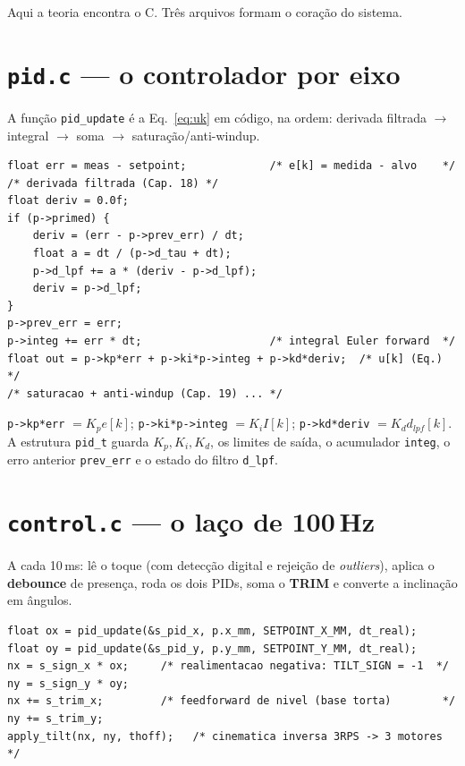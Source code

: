 Aqui a teoria encontra o C. Tr\^es arquivos formam o cora\c{c}\~ao do sistema.

\section{\texttt{pid.c} --- o controlador por eixo}
A fun\c{c}\~ao \texttt{pid\_update} \'e a Eq.~\eqref{eq:uk} em c\'odigo, na ordem:
derivada filtrada $\to$ integral $\to$ soma $\to$ satura\c{c}\~ao/anti-windup.
\begin{lstlisting}[caption={N\'ucleo de \texttt{pid\_update} (resumido).},label={lst:pid}]
float err = meas - setpoint;             /* e[k] = medida - alvo    */
/* derivada filtrada (Cap. 18) */
float deriv = 0.0f;
if (p->primed) {
    deriv = (err - p->prev_err) / dt;
    float a = dt / (p->d_tau + dt);
    p->d_lpf += a * (deriv - p->d_lpf);
    deriv = p->d_lpf;
}
p->prev_err = err;
p->integ += err * dt;                    /* integral Euler forward  */
float out = p->kp*err + p->ki*p->integ + p->kd*deriv;  /* u[k] (Eq.) */
/* saturacao + anti-windup (Cap. 19) ... */
\end{lstlisting}
\begin{conceito}
\texttt{p->kp*err} $=K_p e[k]$;\quad
\texttt{p->ki*p->integ} $=K_i I[k]$;\quad
\texttt{p->kd*deriv} $=K_d d_{lpf}[k]$.\quad
A estrutura \texttt{pid\_t} guarda $K_p,K_i,K_d$, os limites de sa\'ida, o
acumulador \texttt{integ}, o erro anterior \texttt{prev\_err} e o estado do filtro
\texttt{d\_lpf}.
\end{conceito}

\section{\texttt{control.c} --- o la\c{c}o de 100\,Hz}
A cada 10\,ms: l\^e o toque (com detec\c{c}\~ao digital e rejei\c{c}\~ao de
\emph{outliers}), aplica o \textbf{debounce} de presen\c{c}a, roda os dois PIDs,
soma o \textbf{TRIM} e converte a inclina\c{c}\~ao em \^angulos.
\begin{lstlisting}[caption={Trecho central de \texttt{control.c} (sa\'ida do PID $\to$ motores).},label={lst:control}]
float ox = pid_update(&s_pid_x, p.x_mm, SETPOINT_X_MM, dt_real);
float oy = pid_update(&s_pid_y, p.y_mm, SETPOINT_Y_MM, dt_real);
nx = s_sign_x * ox;     /* realimentacao negativa: TILT_SIGN = -1  */
ny = s_sign_y * oy;
nx += s_trim_x;         /* feedforward de nivel (base torta)        */
ny += s_trim_y;
apply_tilt(nx, ny, thoff);   /* cinematica inversa 3RPS -> 3 motores */
\end{lstlisting}

